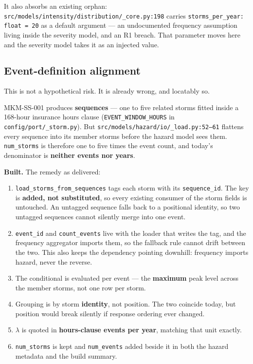 \documentclass[11pt]{article}
\begin{document}
\noindent It also absorbs an existing orphan:
\texttt{src/models/intensity/distribution/\_core.py:198} carries
\texttt{storms\_per\_year: float = 20} as a default argument --- an undocumented
frequency assumption living inside the severity model, and an R1 breach. That
parameter moves here and the severity model takes it as an injected value.

\subsection{Event-definition alignment}
\label{sec:eventdef}

This is not a hypothetical risk. It is already wrong, and locatably so.

MKM-SS-001 produces \textbf{sequences} --- one to five related storms fitted
inside a 168-hour insurance hours clause
(\texttt{EVENT\_WINDOW\_HOURS} in \texttt{config/port/\_storm.py}). But
\texttt{src/models/hazard/io/\_load.py:52--61} flattens every sequence into its
member storms before the hazard model sees them. \texttt{num\_storms} is
therefore one to five times the event count, and today's denominator is
\textbf{neither events nor years}.

\medskip
\noindent \textbf{Built.} The remedy as delivered:

\begin{enumerate}[nosep]
  \item \texttt{load\_storms\_from\_sequences} tags each storm with its
        \texttt{sequence\_id}. The key is \textbf{added, not substituted}, so
        every existing consumer of the storm fields is untouched. An untagged
        sequence falls back to a positional identity, so two untagged sequences
        cannot silently merge into one event.
  \item \texttt{event\_id} and \texttt{count\_events} live with the loader that
        writes the tag, and the frequency aggregator imports them, so the
        fallback rule cannot drift between the two. This also keeps the
        dependency pointing downhill: frequency imports hazard, never the
        reverse.
  \item The conditional is evaluated per event --- the \textbf{maximum} peak
        level across the member storms, not one row per storm.
  \item Grouping is by storm \textbf{identity}, not position. The two coincide
        today, but position would break silently if response ordering ever
        changed.
  \item $\lambda$ is quoted in \textbf{hours-clause events per year}, matching
        that unit exactly.
  \item \texttt{num\_storms} is kept and \texttt{num\_events} added beside it in
        both the hazard metadata and the build summary.
\end{enumerate}
\end{document}
